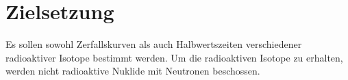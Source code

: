 
\section{Zielsetzung}
\label{sec:Zielsetzung}
Es sollen sowohl Zerfallskurven als auch Halbwertszeiten verschiedener radioaktiver Isotope bestimmt werden. Um die
radioaktiven Isotope zu erhalten, werden nicht radioaktive Nuklide mit Neutronen beschossen. 
